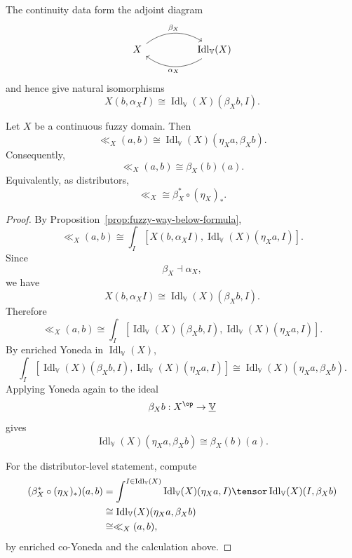 The continuity data form the adjoint diagram
\[
\begin{tikzcd}[column sep=huge,row sep=large]
X
    \ar[r,bend left=35,"\beta_X"]
&
\operatorname{Idl}_{\mathbb V}(X)
    \ar[l,bend left=35,"\alpha_X"]
\end{tikzcd}
\]
and hence give natural isomorphisms
\[
    X(b,\alpha_X I)
    \cong
    \operatorname{Idl}_{\mathbb V}(X)(\beta_X b,I).
\]

\begin{theorem}
\label{thm:continuity-represents-way-below}
Let \(X\) be a continuous fuzzy domain. Then
\[
    \ll_X(a,b)
    \cong
    \operatorname{Idl}_{\mathbb V}(X)(\eta_X a,\beta_X b).
\]
Consequently,
\[
    \ll_X(a,b)\cong \beta_X(b)(a).
\]
Equivalently, as distributors,
\[
    \ll_X
    \cong
    \beta_X^\ast\circ(\eta_X)_\ast.
\]
\end{theorem}

\begin{proof}
By Proposition~\ref{prop:fuzzy-way-below-formula},
\[
    \ll_X(a,b)
    \cong
    \int_I
    \left[
        X(b,\alpha_X I),
        \operatorname{Idl}_{\mathbb V}(X)(\eta_X a,I)
    \right].
\]
Since
\[
    \beta_X\dashv\alpha_X,
\]
we have
\[
    X(b,\alpha_X I)
    \cong
    \operatorname{Idl}_{\mathbb V}(X)(\beta_X b,I).
\]
Therefore
\[
    \ll_X(a,b)
    \cong
    \int_I
    \left[
        \operatorname{Idl}_{\mathbb V}(X)(\beta_X b,I),
        \operatorname{Idl}_{\mathbb V}(X)(\eta_X a,I)
    \right].
\]
By enriched Yoneda in \(\operatorname{Idl}_{\mathbb V}(X)\),
\[
    \int_I
    \left[
        \operatorname{Idl}_{\mathbb V}(X)(\beta_X b,I),
        \operatorname{Idl}_{\mathbb V}(X)(\eta_X a,I)
    \right]
    \cong
    \operatorname{Idl}_{\mathbb V}(X)(\eta_X a,\beta_X b).
\]
Applying Yoneda again to the ideal
\[
    \beta_X b:X^{\op}\to\underline{\mathbb V}
\]
gives
\[
    \operatorname{Idl}_{\mathbb V}(X)(\eta_X a,\beta_X b)
    \cong
    \beta_X(b)(a).
\]

For the distributor-level statement, compute
\[
\begin{aligned}
(\beta_X^\ast\circ(\eta_X)_\ast)(a,b)
&=
\int^{I\in\operatorname{Idl}_{\mathbb V}(X)}
\operatorname{Idl}_{\mathbb V}(X)(\eta_Xa,I)
\tensor
\operatorname{Idl}_{\mathbb V}(X)(I,\beta_Xb)
\\
&\cong
\operatorname{Idl}_{\mathbb V}(X)(\eta_Xa,\beta_Xb)
\\
&\cong
\ll_X(a,b),
\end{aligned}
\]
by enriched co-Yoneda and the calculation above.
\end{proof}

